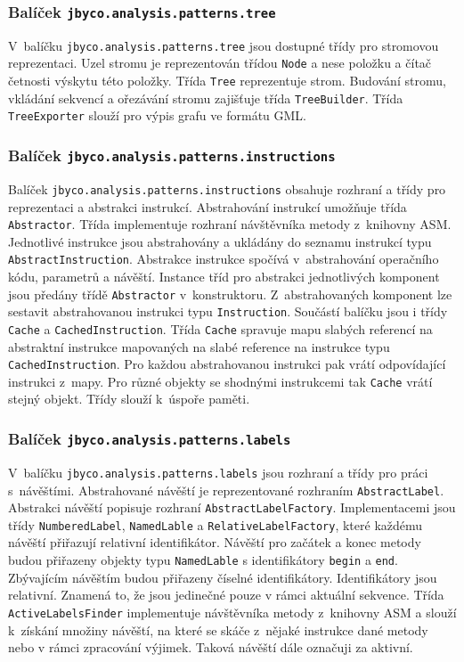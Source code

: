 \subsubsection{Balíček \texttt{jbyco.analysis.patterns.tree}}

V~balíčku \texttt{jbyco.analysis.patterns.tree} jsou dostupné třídy pro stromovou reprezentaci. Uzel stromu je reprezentován třídou \texttt{Node} a nese položku a čítač četnosti výskytu této položky. Třída \texttt{Tree} reprezentuje strom. Budování stromu, vkládání sekvencí a ořezávání stromu zajišťuje třída \texttt{TreeBuilder}. Třída \texttt{TreeExporter} slouží pro výpis grafu ve formátu GML.

\subsubsection{Balíček \texttt{jbyco.analysis.patterns.instructions}}

Balíček \texttt{jbyco.analysis.patterns.instructions} obsahuje rozhraní a třídy pro reprezentaci a abstrakci instrukcí. Abstrahování instrukcí umožňuje třída \texttt{Abstractor}. Třída implementuje rozhraní návštěvníka metody z~knihovny ASM. Jednotlivé instrukce jsou abstrahovány a ukládány do seznamu instrukcí typu \texttt{AbstractInstruction}. Abstrakce instrukce spočívá v~abstrahování operačního kódu, parametrů a návěští. Instance tříd pro abstrakci jednotlivých komponent jsou předány třídě \texttt{Abstractor} v~konstruktoru. Z~abstrahovaných komponent lze sestavit abstrahovanou instrukci typu \texttt{Instruction}. Součástí balíčku jsou i třídy \texttt{Cache} a \texttt{CachedInstruction}. Třída \texttt{Cache} spravuje mapu slabých referencí na abstraktní instrukce mapovaných na slabé reference na instrukce typu \texttt{CachedInstruction}. Pro každou abstrahovanou instrukci pak vrátí odpovídající instrukci z~mapy. Pro různé objekty se shodnými instrukcemi tak \texttt{Cache} vrátí stejný objekt. Třídy slouží k~úspoře paměti.

\subsubsection{Balíček \texttt{jbyco.analysis.patterns.labels}}

V~balíčku \texttt{jbyco.analysis.patterns.labels} jsou rozhraní a třídy pro práci s~návěštími. Abstrahované návěští je reprezentované rozhraním \texttt{AbstractLabel}. Abstrakci návěští popisuje rozhraní \texttt{AbstractLabelFactory}. Implementacemi jsou třídy \texttt{NumberedLabel}, \texttt{NamedLable} a \texttt{RelativeLabelFactory}, které každému návěští přiřazují relativní identifikátor. Návěští pro začátek a konec metody budou přiřazeny objekty typu \texttt{NamedLable} s identifikátory \texttt{begin} a \texttt{end}. Zbývajícím návěštím budou přiřazeny číselné identifikátory. Identifikátory jsou relativní. Znamená to, že jsou jedinečné pouze v rámci aktuální sekvence. Třída \texttt{ActiveLabelsFinder} implementuje návštěvníka metody z~knihovny ASM a slouží k~získání množiny návěští, na které se skáče z~nějaké instrukce dané metody nebo v rámci zpracování výjimek. Taková návěští dále označuji za aktivní.

